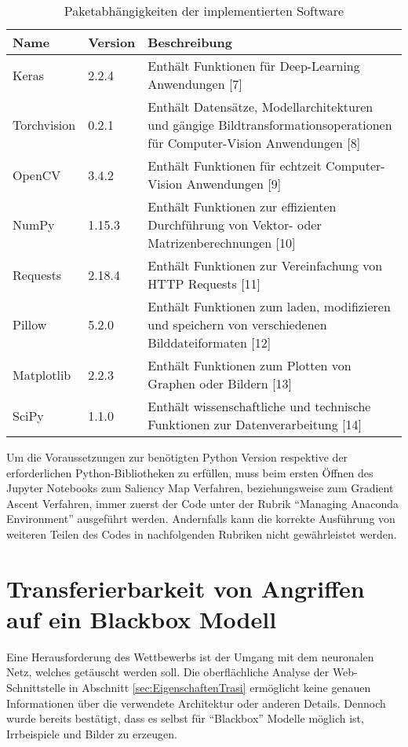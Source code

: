\begin{table}
	\centering
	\begin{tabular}{|l|l|p{10.4cm}|}
		\hline 
		Name & Version & Beschreibung \\ 
		\hline\hline 
		Keras& 2.2.4  & Enthält Funktionen für Deep-Learning Anwendungen [7] \\ 
		\hline 
		Torchvision& 0.2.1 & Enthält Datensätze, Modellarchitekturen und gängige Bildtransformationsoperationen für Computer-Vision Anwendungen [8] \\ 
		\hline 
		OpenCV& 3.4.2  & Enthält Funktionen für echtzeit Computer-Vision Anwendungen [9] \\ 
		\hline 
		NumPy&  1.15.3& Enthält Funktionen zur effizienten Durchführung von Vektor- oder Matrizenberechnungen [10] \\ 
		\hline 
		Requests& 2.18.4 & Enthält Funktionen zur Vereinfachung von HTTP Requests [11] \\ 
		\hline 
		Pillow& 5.2.0 & Enthält Funktionen zum laden, modifizieren und speichern von verschiedenen Bilddateiformaten [12] \\ 
		\hline 
		Matplotlib& 2.2.3 & Enthält Funktionen zum Plotten von Graphen oder Bildern [13] \\ 
		\hline 
		SciPy& 1.1.0  & Enthält wissenschaftliche und technische Funktionen zur Datenverarbeitung [14] \\ 
		\hline 
	\end{tabular} 
	\caption{Paketabhängigkeiten der implementierten Software}
	\label{tab:parameter}
\end{table}

Um die Voraussetzungen zur benötigten Python Version respektive der erforderlichen Python-Bibliotheken zu erfüllen, muss beim ersten Öffnen des Jupyter Notebooks zum Saliency Map Verfahren, beziehungsweise zum Gradient Ascent Verfahren, immer zuerst der Code unter der Rubrik “Managing Anaconda Environment” ausgeführt werden. Andernfalls kann die korrekte Ausführung von weiteren Teilen des Codes in nachfolgenden Rubriken nicht gewährleistet werden.

\section{Transferierbarkeit von Angriffen auf ein Blackbox Modell}


\label{sec:TrasiModell}
Eine Herausforderung des Wettbewerbs ist der Umgang mit dem neuronalen Netz, welches getäuscht werden soll. Die oberflächliche Analyse der Web-Schnittstelle in Abschnitt \ref{sec:EigenschaftenTrasi} ermöglicht keine genauen Informationen über die verwendete Architektur oder anderen Details. Dennoch wurde bereits bestätigt, dass es selbst für “Blackbox” Modelle möglich ist, Irrbeispiele und Bilder zu erzeugen.

